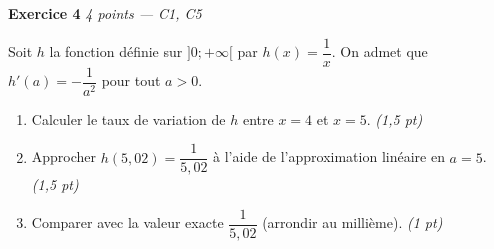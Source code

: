 \bigskip

\textbf{Exercice 4} \hfill \textit{4 points — C1, C5}

Soit $h$ la fonction définie sur $]0;+\infty[$ par $h(x) = \dfrac{1}{x}$. On admet que $h'(a) = -\dfrac{1}{a^2}$ pour tout $a > 0$.

\begin{enumerate}
  \item Calculer le taux de variation de $h$ entre $x=4$ et $x=5$. \hfill \textit{(1,5 pt)}
  \item Approcher $h(5{,}02) = \dfrac{1}{5{,}02}$ à l'aide de l'approximation linéaire en $a=5$. \hfill \textit{(1,5 pt)}
  \item Comparer avec la valeur exacte $\dfrac{1}{5{,}02}$ (arrondir au millième). \hfill \textit{(1 pt)}
\end{enumerate}


